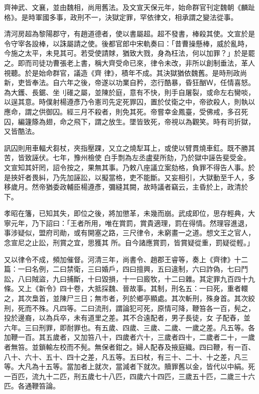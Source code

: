 \begin{pinyinscope}
 齊神武、文襄，並由魏相，尚用舊法。及文宣天保元年，始命群官刊定魏朝《麟趾格》。是時軍國多事，政刑不一，決獄定罪，罕依律文，相承謂之變法從事。



 清河房超為黎陽郡守，有趙道德者，使以書屬超。超不發書，棒殺其使。文宣於是令守宰各設棒，以誅屬請之使。後都官郎中宋軌奏曰：「昔曹操懸棒，威於亂時，今施之太平，未見其可。若受使請賕，猶致大戮，身為枉法，何以加罪？」於是罷之。即而司徒功曹張老上書，稱大齊受命已來，律令未改，非所以創制垂法，革人視聽。於是始命群官，議造《齊
 律》，積年不成。其決獄猶依魏舊。是時刑政尚新，吏皆奉法。自六年之後，帝遂以功業自矜，恣行酷暴，昏狂酗Ｗ，任情喜怒。為大鑊、長鋸、坐刂碓之屬，並陳於庭，意有不快，則手自屠裂，或命左右臠啖，以逞其意。時僕射楊遵彥乃令憲司先定死罪囚，置於仗衛之中，帝欲殺人，則執以應命，謂之供御囚。經三月不殺者，則免其死。帝嘗幸金鳳臺，受佛戒，多召死囚，編籧篨為翅，命之飛下，謂之放生。墜皆致死，帝視以為觀笑。時有司折獄，又皆酷法。



 訊囚則用車輻犬芻杖，夾指壓踝，又立之燒犁耳上，或使以臂貫燒車釭。既不勝其苦，皆致誣伏。七年，豫州檢使
 白手剽為左丞盧斐所劾，乃於獄中誣告斐受金。文宣知其奸罔，詔令按之，果無其事。乃敕八座議立案劾格，負罪不得告人事。於是挾奸者畏糾，乃先加誣訟，以擬當格，吏不能斷。又妄相引，大獄動至千人，多移歲月。然帝猶委政輔臣楊遵彥，彌縫其闕，故時議者竊云，主昏於上，政清於下。



 孝昭在籓，已知其失，即位之後，將加懲革，未幾而崩。武成即位，思存輕典，大寧元年，乃下詔曰：「王者所用，唯在賞罰，賞貴適理，罰在得情。然理容進退，事涉疑似，盟府司勛，或有開塞之路，三尺律令，未窮畫一之道。想文王之官人，念宣尼之止訟，刑賞之宜，思獲其
 所。自今諸應賞罰，皆賞疑從重，罰疑從輕。」



 又以律令不成，頻加催督。河清三年，尚書令、趙郡王睿等，奏上《齊律》十二篇：一曰名例，二曰禁衛，三曰婚戶，四曰擅興，五曰違制，六曰詐偽，七曰鬥訟，八曰賊盜，九曰捕斷，十曰毀損，十一曰廄牧，十二曰雜。其定罪九百四十九條。又上《新令》四十卷，大抵採魏、晉故事。其制，刑名五：一曰死，重者轘之，其次梟首，並陳尸三日；無市者，列於鄉亭顯處。其次斬刑，殊身首。其次絞刑，死而不殊。凡四等。二曰流刑，謂論犯可死，原情可降，鞭笞各一百，髡之，投於邊裔，以為兵卒，未有道里之差。其不合遠配者，男子長徒，女
 子配舂，並六年。三曰刑罪，即耐罪也。有五歲、四歲、三歲、二歲、一歲之差。凡五等。各加鞭一百。其五歲者，又加笞八十，四歲者六十，三歲者四十，二歲者二十，一歲者無笞。並鎖輸左校而不髡。無保者鉗之。婦人配舂及掖庭織。四曰鞭，有一百、八十、六十、五十、四十之差，凡五等。五曰杖，有三十、二十、十之差，凡三等。大凡為十五等。當加者上就次，當減者下就次。贖罪舊以金，皆代以中絹。死一百匹，流九十二匹，刑五歲七十八匹，四歲六十四匹，三歲五十匹，二歲三十六匹。各通鞭笞論。




\end{pinyinscope}
